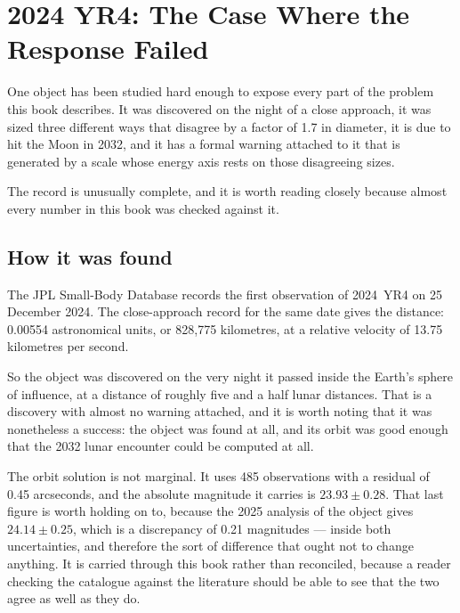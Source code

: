 
\chapter{2024 YR4: The Case Where the Response Failed}
\label{ch:yr4}

One object has been studied hard enough to expose every part of the problem
this book describes. It was discovered on the night of a close approach, it
was sized three different ways that disagree by a factor of 1.7 in diameter,
it is due to hit the Moon in 2032, and it has a formal warning attached to it
that is generated by a scale whose energy axis rests on those disagreeing
sizes.

The record is unusually complete, and it is worth reading closely because
almost every number in this book was checked against it.

\section{How it was found}

The JPL Small-Body Database records the first observation of 2024~YR4 on
25 December 2024. The close-approach record for the same date gives the
distance: 0.00554 astronomical units, or 828,775 kilometres, at a relative
velocity of 13.75 kilometres per second.

So the object was discovered on the very night it passed inside the Earth's
sphere of influence, at a distance of roughly five and a half lunar
distances. That is a discovery with almost no warning attached, and it is
worth noting that it was nonetheless a success: the object was found at
all, and its orbit was good enough that the 2032 lunar encounter could be
computed at all.

The orbit solution is not marginal. It uses 485 observations with a residual
of 0.45 arcseconds, and the absolute magnitude it carries is
\(23.93 \pm 0.28\). That last figure is worth holding on to, because the
2025  analysis of the object gives \(24.14 \pm 0.25\), which is a
discrepancy of 0.21 magnitudes --- inside both uncertainties, and therefore
the sort of difference that ought not to change anything. It is carried
through this book rather than reconciled, because a reader checking the
catalogue against the literature should be able to see that the two agree as
well as they do.

